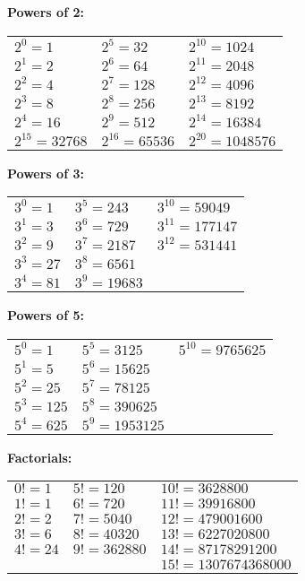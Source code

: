 \textbf{Powers of 2:} \\[1mm]
\begin{tabular}{lll}
$2^0=1$ & $2^5=32$ & $2^{10}=1024$ \\
$2^1=2$ & $2^6=64$ & $2^{11}=2048$ \\
$2^2=4$ & $2^7=128$ & $2^{12}=4096$ \\
$2^3=8$ & $2^8=256$ & $2^{13}=8192$ \\
$2^4=16$ & $2^9=512$ & $2^{14}=16384$ \\
$2^{15}=32768$ & $2^{16}=65536$ & $2^{20}=1048576$ \\
\end{tabular}

\vspace{2mm}
\textbf{Powers of 3:} \\[1mm]
\begin{tabular}{lll}
$3^0=1$ & $3^5=243$ & $3^{10}=59049$ \\
$3^1=3$ & $3^6=729$ & $3^{11}=177147$ \\
$3^2=9$ & $3^7=2187$ & $3^{12}=531441$ \\
$3^3=27$ & $3^8=6561$ &  \\
$3^4=81$ & $3^9=19683$ &  \\
\end{tabular}

\vspace{2mm}
\textbf{Powers of 5:} \\[1mm]
\begin{tabular}{lll}
$5^0=1$ & $5^5=3125$ & $5^{10}=9765625$ \\
$5^1=5$ & $5^6=15625$ &  \\
$5^2=25$ & $5^7=78125$ &  \\
$5^3=125$ & $5^8=390625$ &  \\
$5^4=625$ & $5^9=1953125$ &  \\
\end{tabular}

\vspace{2mm}
\textbf{Factorials:} \\[1mm]
\begin{tabular}{lll}
$0! = 1$ & $5! = 120$ & $10! = 3628800$ \\
$1! = 1$ & $6! = 720$ & $11! = 39916800$ \\
$2! = 2$ & $7! = 5040$ & $12! = 479001600$ \\
$3! = 6$ & $8! = 40320$ & $13! = 6227020800$ \\
$4! = 24$ & $9! = 362880$ & $14! = 87178291200$ \\
& & $15! = 1307674368000$ \\
\end{tabular}

